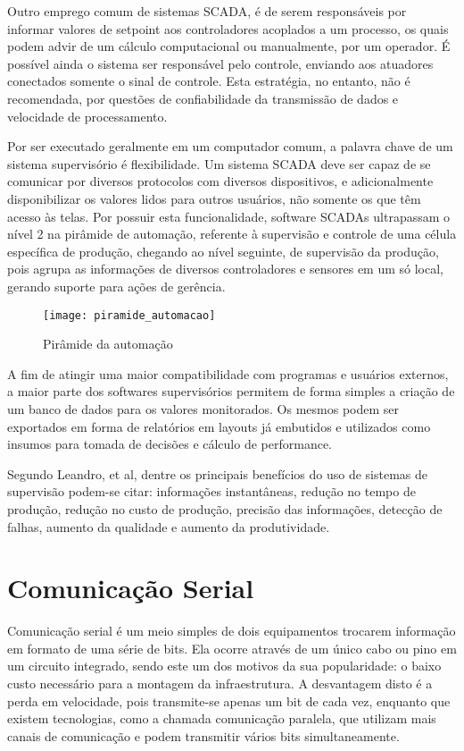 Outro emprego comum de sistemas SCADA, é de serem responsáveis por informar valores de setpoint aos controladores acoplados a um processo, os quais podem advir de um cálculo computacional ou manualmente, por um operador. É possível ainda o sistema ser responsável pelo controle, enviando aos atuadores conectados somente o sinal de controle. Esta estratégia, no entanto, não é recomendada, por questões de confiabilidade da transmissão de dados e velocidade de processamento.

Por ser executado geralmente em um computador comum, a palavra chave de um sistema supervisório é flexibilidade. Um sistema SCADA deve ser capaz de se comunicar por diversos protocolos com diversos dispositivos, e adicionalmente disponibilizar os valores lidos para outros usuários, não somente os que têm acesso às telas. Por possuir esta funcionalidade, software SCADAs ultrapassam o nível 2 na pirâmide de automação, referente à supervisão e controle de uma célula específica de produção, chegando ao nível seguinte, de supervisão da produção, pois agrupa as informações de diversos controladores e sensores em um só local, gerando suporte para ações de gerência.

\begin{figure}[H]
	\centering
	\texttt{[image: piramide\_automacao]}
	\caption{Pirâmide da automação}
	\label{img_piramide_automacao}
\end{figure}

A fim de atingir uma maior compatibilidade com programas e usuários externos, a maior parte dos softwares supervisórios permitem de forma simples a criação de um banco de dados para os valores monitorados. Os mesmos podem ser exportados em forma de relatórios em layouts já embutidos e utilizados como insumos para tomada de decisões e cálculo de performance.

Segundo Leandro, et al, dentre os principais benefícios do uso de sistemas de supervisão podem-se citar: informações instantâneas, redução no tempo de produção, redução no custo de produção, precisão das informações, detecção de falhas, aumento da qualidade e aumento da produtividade.

\section{Comunicação Serial}

Comunicação serial é um meio simples de dois equipamentos trocarem informação em formato de uma série de bits. Ela ocorre através de um único cabo ou pino em um circuito integrado, sendo este um dos motivos da sua popularidade: o baixo custo necessário para a montagem da infraestrutura. A desvantagem disto é a perda em velocidade, pois transmite-se apenas um bit de cada vez, enquanto que existem tecnologias, como a chamada comunicação paralela, que utilizam mais canais de comunicação e podem transmitir vários bits simultaneamente.

